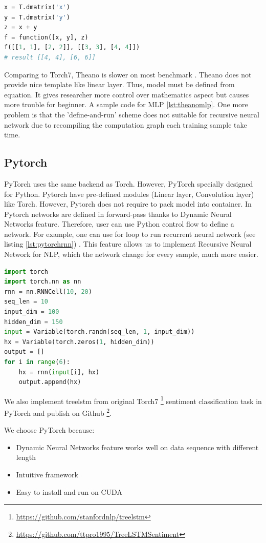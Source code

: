 \begin{lstlisting}[caption={Define function in Theano},label={lst:theanof}, language={python}]
x = T.dmatrix('x')
y = T.dmatrix('y')
z = x + y
f = function([x, y], z)
f([[1, 1], [2, 2]], [[3, 3], [4, 4]])
# result [[4, 4], [6, 6]]
\end{lstlisting}

Comparing to Torch7, Theano is slower on most benchmark \cite{collobert2011torch7}. Theano does not provide nice template like linear layer. Thus, model must be defined from equation. It gives researcher more control over mathematics aspect but causes more trouble for beginner. A sample code for MLP \ref{lst:theanomlp}. One more problem is that the 'define-and-run' scheme does not suitable for recursive neural network due to recompiling the computation graph each training sample take time.

\subsection{Pytorch}\label{sec:pytorch}
PyTorch uses the same backend as Torch. However, PyTorch specially designed for Python. Pytorch have pre-defined modules (Linear layer, Convolution layer) like Torch. However, Pytorch does not require to pack model into container. In Pytorch networks are defined in forward-pass thanks to Dynamic Neural Networks feature. Therefore, user can use Python control flow to define a network. For example, one can use for loop to run recurrent neural network (see listing \ref{lst:pytorchrnn}) .
This feature allows us to implement Recursive Neural Network for NLP, which the network change for every sample, much more easier. 

\begin{lstlisting}[caption={RNN},label={lst:pytorchrnn}, language={python}]
import torch
import torch.nn as nn
rnn = nn.RNNCell(10, 20)
seq_len = 10
input_dim = 100
hidden_dim = 150
input = Variable(torch.randn(seq_len, 1, input_dim))
hx = Variable(torch.zeros(1, hidden_dim))
output = []
for i in range(6):
    hx = rnn(input[i], hx)
    output.append(hx)
\end{lstlisting}

We also implement treelstm from original Torch7 \footnote{\url{https://github.com/stanfordnlp/treelstm}} sentiment classification task in PyTorch and publish on Github \footnote{\url{https://github.com/ttpro1995/TreeLSTMSentiment}}.

We choose PyTorch because:
\begin{itemize}
    \item Dynamic Neural Networks feature works well on data sequence with different length
    \item Intuitive framework
    \item Easy to install and run on CUDA
\end{itemize}

